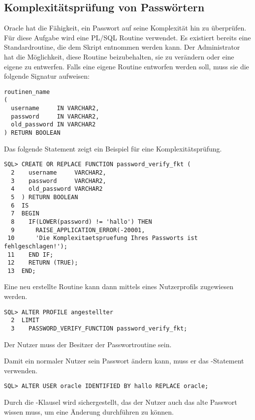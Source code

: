       \subsection{Komplexitätsprüfung von Passwörtern}
        Oracle hat die Fähigkeit, ein Passwort auf seine Komplexität hin zu überprüfen. Für diese Aufgabe wird eine PL/SQL Routine verwendet. Es existiert bereits eine Standardroutine, die dem Skript  entnommen werden kann. Der Administrator hat die Möglichkeit, diese Routine beizubehalten, sie zu verändern oder eine eigene zu entwerfen.
\clearpage
        Falls eine eigene Routine entworfen werden soll, muss sie die folgende Signatur aufweisen:
        \begin{lstlisting}[caption={Format der Passwortroutine},label=admin224,language=plsql]
routinen_name
(
  username     IN VARCHAR2,
  password     IN VARCHAR2,
  old_password IN VARCHAR2
) RETURN BOOLEAN
        \end{lstlisting}
        Das folgende Statement zeigt ein Beispiel für eine Komplexitätsprüfung.
        \begin{lstlisting}[caption={Beispielkomplexitätsroutine},label=admin225, language=plsql]
SQL> CREATE OR REPLACE FUNCTION password_verify_fkt (
  2    username     VARCHAR2,
  3    password     VARCHAR2,
  4    old_password VARCHAR2
  5  ) RETURN BOOLEAN
  6  IS
  7  BEGIN
  8    IF(LOWER(password) != 'hallo') THEN
  9      RAISE_APPLICATION_ERROR(-20001,
 10      'Die Komplexitaetspruefung Ihres Passworts ist fehlgeschlagen!');
 11    END IF;
 12    RETURN (TRUE);
 13  END;
        \end{lstlisting}
        Eine neu erstellte Routine kann dann mittels eines Nutzerprofils zugewiesen werden.
        \begin{lstlisting}[caption={Passwortroutine
        zuweisen},label=admin226,language=oracle_sql]
SQL> ALTER PROFILE angestellter
  2  LIMIT
  3    PASSWORD_VERIFY_FUNCTION password_verify_fkt;
        \end{lstlisting}
        \begin{merke}
          Der Nutzer  muss der Besitzer der Passwortroutine sein.
        \end{merke}
        Damit ein normaler Nutzer sein Passwort ändern kann, muss er das
        -Statement verwenden.
        \begin{lstlisting}[caption={Ein Nutzer ändert sein Passwort}, label=admin227, language=oracle_sql]
SQL> ALTER USER oracle IDENTIFIED BY hallo REPLACE oracle;
        \end{lstlisting}
        Durch die -Klausel wird sichergestellt, das der Nutzer auch das alte Passwort wissen muss, um eine Änderung durchführen zu können.
